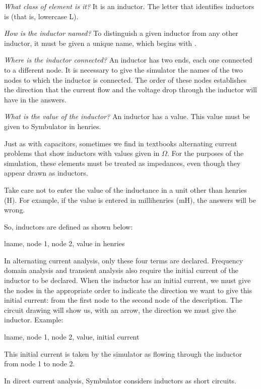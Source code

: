 \emph{What class of element is it?} It is an inductor. The letter
that identifies inductors is  (that is, lowercase L).

\emph{How is the inductor named?} To distinguish a given inductor
from any other inductor, it must be given a unique name, which
begins with .

\emph{Where is the inductor connected?} An inductor has two ends,
each one connected to a different node. It is necessary to give the
simulator the names of the two nodes to which the inductor is
connected. The order of these nodes establishes the direction that
the current flow and the voltage drop through the inductor will have
in the answers.

\emph{What is the value of the inductor?} An inductor has a value.
This value must be given to Symbulator in henries.

Just as with capacitors, sometimes we find in textbooks alternating
current problems that show inductors with values given in $\Omega$.
For the purposes of the simulation, these elements must be treated
as impedances, even though they appear drawn as inductors.

Take care not to enter the value of the inductance in a unit other
than henries (H). For example, if the value is entered in
millihenries (mH), the answers will be wrong.

So, inductors are defined as shown below:

\begin{entry}
lname, node 1, node 2, value in henries
\end{entry}

In alternating current analysis, only these four terms are declared.
Frequency domain analysis and transient analysis also require the
initial current of the inductor to be declared. When the inductor
has an initial current, we must give the nodes in the appropriate
order to indicate the direction we want to give this initial
current: from the first node to the second node of the description.
The circuit drawing will show us, with an arrow, the direction we
must give the inductor. Example:

\begin{entry}
lname, node 1, node 2, value, initial current
\end{entry}

This initial current is taken by the simulator as flowing through
the inductor from node 1 to node 2.

In direct current analysis, Symbulator considers inductors as short
circuits.

